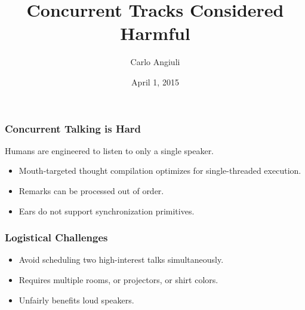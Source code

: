 \documentclass{beamer}
\title{Concurrent Tracks Considered Harmful}
\author{Carlo Angiuli}
\date{April 1, 2015}
\institute{SIGBOVIK Organizing Committee}
\begin{document}
\begin{frame}
\maketitle
\end{frame}

{
\begin{frame}
\frametitle{Concurrent Talking is Hard}
\color{blue}
Humans are engineered to listen to only a single speaker.
\vspace{1em}
\begin{itemize}
\color{blue}
\item Mouth-targeted thought compilation optimizes for single-threaded
execution.
\item Remarks can be processed out of order.
\item Ears do not support synchronization primitives.
\end{itemize}
\end{frame}
}

\begin{frame}
\frametitle{Logistical Challenges}
\begin{itemize}
\item Avoid scheduling two high-interest talks simultaneously.
\item Requires multiple rooms, or projectors, or shirt colors.
\item Unfairly benefits loud speakers.
\end{itemize}
\end{frame}
\end{document}

